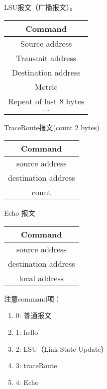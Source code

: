 	LSU报文（广播报文）。
	\begin{table}[H]
	\centering
		\begin{tabular}{|c|}
			\hline
			Command \\
			\hline
			Source address \\
			\hline
			Transmit address \\
			\hline
			Destination address \\
			\hline
			Metric \\
			\hline
			Repeat of last 8 bytes \\
			\hline
			$\cdots$ \\
			\hline
		\end{tabular}		
	\end{table}

	TraceRoute报文(count 2 bytes)
	\begin{table}[H]
	\centering
		\begin{tabular}{|c|}
			\hline
			Command \\
			\hline
			source address \\
			\hline
			destination address \\
			\hline
			count \\
			\hline
		\end{tabular}		
	\end{table}	

	Echo 报文
	\begin{table}[H]
	\centering
		\begin{tabular}{|c|}
			\hline
			Command \\
			\hline
			source address \\
			\hline
			destination address \\
			\hline
			local address \\
			\hline
		\end{tabular}		
	\end{table}
	注意command项：
	\begin{enumerate}[]
		\item 0: 普通报文
		\item 1: hello
		\item 2: LSU（Link State Update）
		\item 3: traceRoute
		\item 4: Echo
	\end{enumerate}

